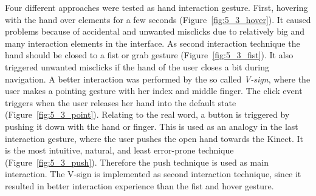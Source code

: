 Four different approaches were tested as hand interaction gesture.
First, hovering with the hand over elements for a few seconds (Figure~\ref{fig:5_3_hover}).
It caused problems because of accidental and unwanted misclicks due to relatively big and many interaction elements in the interface.
As second interaction technique the hand should be closed to a fist or grab gesture (Figure~\ref{fig:5_3_fist}).
It also triggered unwanted misclicks if the hand of the user closes a bit during navigation.
A better interaction was performed by the so called \textit{V-sign}, where the user makes a pointing gesture with her index and middle finger.
The click event triggers when the user releases her hand into the default state (Figure~\ref{fig:5_3_point}).
Relating to the real word, a button is triggered by pushing it down with the hand or finger.
This is used as an analogy in the last interaction gesture, where the user pushes the open hand towards the Kinect.
It is the most intuitive, natural, and least error-prone technique (Figure~\ref{fig:5_3_push}). %
Therefore the push technique is used as main interaction. The V-sign is implemented as second interaction technique, since it resulted in better interaction experience than the fist and hover gesture.
